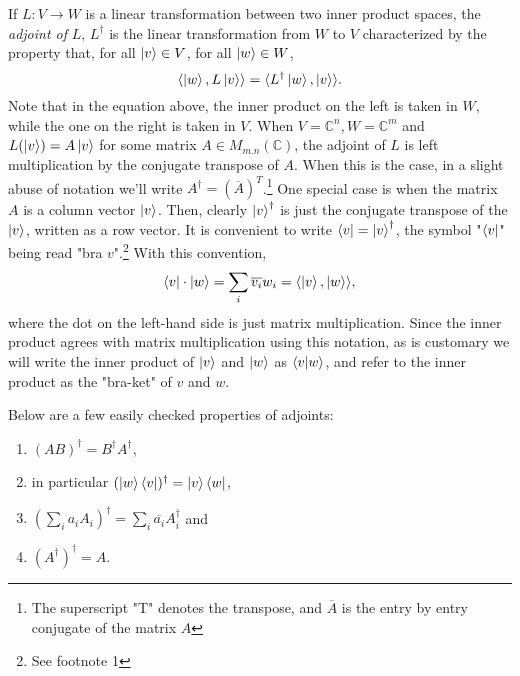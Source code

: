 If $L:V \to W$ is a linear transformation between two inner product spaces, the {\emph{adjoint of }}$L$, $L^\dagger$ is the linear transformation from $W$ to $V$ characterized by the property that, \textrm{ for all } $\ket{v} \in V$, \textrm{ for all }$\ket{w} \in W$, 
\begin{equation}
    \langle\ket{w}, L\ket{v}\rangle=\langle L^\dagger \ket{w}, \ket{v}\rangle .
\end{equation}
Note that in the equation above, the inner product on the left is taken in $W$, while the one on the right is taken in $V$.  When $V={\mathbb{C}}^n, W={\mathbb{C}}^m$ and $L(\ket{v})=A\ket{v}$ for some matrix $A \in M_{m.n}(\mathbb{C})$, the adjoint of $L$ is left multiplication by the conjugate transpose of $A$.  When this is the case, in a slight abuse of notation we'll write $A^\dagger=(\overline{A})^T$.\footnote{The superscript "T" denotes the transpose, and $\overline{A}$ is the entry by entry conjugate of the matrix $A$} One special case is when the matrix $A$ is a column vector $\ket{v}$.  Then, clearly $\ket{v}^\dagger$ is just the conjugate transpose of the $\ket{v}$, written as a row vector.  It is convenient to write $\bra{v}={\ket{v}}^\dagger$, the symbol "$\bra{v}$" being read "bra $v$".\footnote{See footnote 1}  With this convention,
\begin{equation}
\bra{v}\cdot \ket{w}=\sum_i \overline{v_i}w_i=\langle \ket{v},\ket{w}\rangle,
\end{equation}
where the dot on the left-hand side is just matrix multiplication.  Since the inner product agrees with matrix multiplication using this notation, as is customary we will write the inner product of $\ket{v}$ and $\ket{w}$ as $\braket{v|w}$, and refer to the inner product as the "bra-ket" of $v$ and $w$.

Below are a few easily checked properties of adjoints:
\begin{enumerate}
    \item $(AB)^\dagger=B^\dagger A^\dagger$,
    \item in particular $(\ket{w}\bra{v})^\dagger=\ket{v}\bra{w}$,
    \item $(\sum_i a_i A_i)^\dagger=\sum_i \overline{a_i} A_i^\dagger$ and 
    \item $(A^\dagger)^\dagger=A$.
\end{enumerate}

